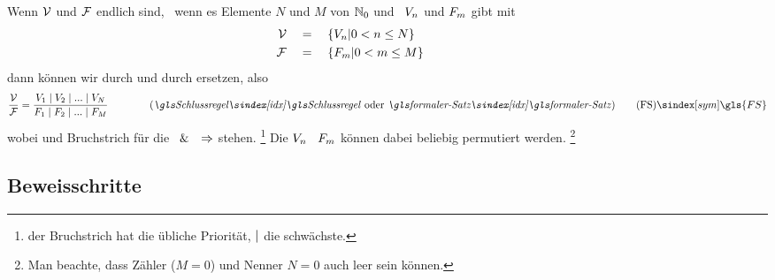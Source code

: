Wenn $\prerequisiteset$ und $\conclusionset$ endlich sind, \textdh\ wenn es Elemente $N$ und $M$ von $\mathbb{N}_0$ und \Aussagen\ $V_n$ und $F_m$ gibt mit
\begin{align}
	\mathcal{V} & \quad = \quad \{V_n | 0 < n \le N \}
	\label{def:Voraussetzungen} \\
	\mathcal{F}     & \quad = \quad \{F_m     | 0 < m \le M \}
	\label{def:Folgerungen} &&&&&&&&&&
\end{align}
dann können wir \seqqt{$\prerequisiteset$} durch  und \seqqt{$\conclusionset$} durch  ersetzen, also \textzB\
\[
	\frac{\prerequisiteset}{\conclusionset} =
	\frac
		{\prerequisite_1 \srand \prerequisite_2 \srand ...\srand \prerequisite_N}
		{\conclusion_1     \srand \conclusion_2     \srand ...\srand \conclusion_M    }
	\qquad \qquad \text{(\emph{\Schlussregel} oder \emph{\formalerSatz})}
	\tag{\tagFS} \sym{\gls{FS}} \label{def:formalerSatz}
\]
wobei \chrqt{$\srand$} und Bruchstrich für die \Metaoperation\ $\&$ \textbzw\ $\Rightarrow$ stehen.%
\footnote{%
	der Bruchstrich hat die übliche Priorität, $\srand$ die schwächste.
}
Die $V_n$ \textbzw\ $F_m$ können dabei beliebig permutiert werden.%
\footnote{%
	Man beachte, dass Zähler ($M=0$) und Nenner $N=0$ auch leer sein können.
}

\subsection{Beweisschritte}%
\label{sub:Beweisschritte}

